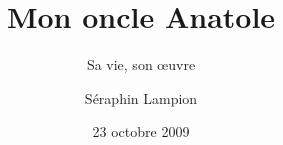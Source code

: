 \documentclass{beamer}
\title{Mon oncle Anatole}
\subtitle{Sa vie, son œuvre}
\author{Séraphin Lampion}
\institute{Assurances Mondass}
\date{23 octobre 2009}
\begin{document}
\begin{frame}

\titlepage

\end{frame}
\end{document}
